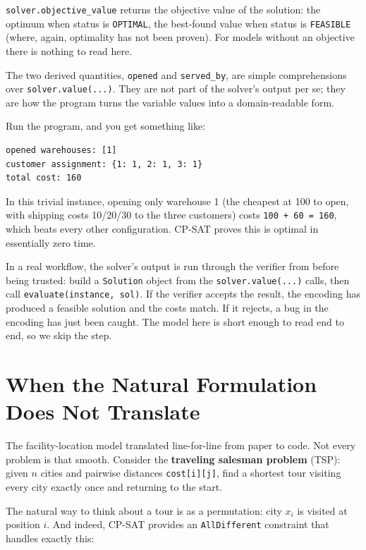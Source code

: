 \lstinline!solver.objective_value! returns the objective
value of the solution: the optimum when status is
\lstinline!OPTIMAL!, the best-found value when status is
\lstinline!FEASIBLE! (where, again, optimality has not
been proven). For models without an objective there is nothing to read
here.

The two derived quantities, \lstinline!opened! and
\lstinline!served_by!, are simple comprehensions over
\lstinline!solver.value(...)!. They are not part of the
solver's output per se; they are how the program turns the variable
values into a domain-readable form.

Run the program, and you get something like:

\begin{lstlisting}
opened warehouses: [1]
customer assignment: {1: 1, 2: 1, 3: 1}
total cost: 160
\end{lstlisting}

In this trivial instance, opening only warehouse 1 (the cheapest at
100 to open, with shipping costs 10/20/30 to the three customers)
costs \lstinline!100 + 60 = 160!, which beats every other
configuration. CP-SAT proves this is optimal in essentially zero time.

In a real workflow, the solver's output is run through the verifier from
 before being trusted: build a
\lstinline!Solution! object from the
\lstinline!solver.value(...)! calls, then call
\lstinline!evaluate(instance, sol)!. If the verifier
accepts the result, the encoding has produced a feasible solution and
the costs match. If it rejects, a bug in the encoding has just been
caught. The model here is short enough to read end to end, so we skip
the step.

\section{When the Natural Formulation Does Not Translate}\label{sec:5.5}

The facility-location model translated line-for-line from paper to code.
Not every problem is that smooth. Consider the \textbf{traveling
salesman problem} (TSP): given \(n\) cities and pairwise distances
\lstinline!cost[i][j]!, find a shortest tour visiting
every city exactly once and returning to the start.

The natural way to think about a tour is as a permutation: city
\(x_i\) is visited at position \(i\). And indeed, CP-SAT provides an
\lstinline!AllDifferent! constraint that handles exactly
this:

